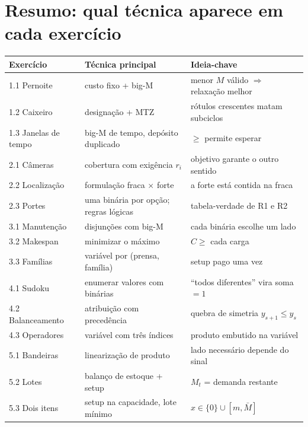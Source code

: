 \documentclass[11pt,a4paper]{article}
\begin{document}
\section*{Resumo: qual técnica aparece em cada exercício}
\begin{center}
\begin{tabular}{>{\raggedright}p{3.2cm}>{\raggedright}p{6.2cm}>{\raggedright\arraybackslash}p{4.8cm}}
\toprule
Exercício & Técnica principal & Ideia-chave\\
\midrule
1.1 Pernoite & custo fixo + big-M & menor $M$ válido $\Rightarrow$ relaxação melhor\\
1.2 Caixeiro & designação + MTZ & rótulos crescentes matam subciclos\\
1.3 Janelas de tempo & big-M de tempo, depósito duplicado & $\ge$ permite esperar\\
2.1 Câmeras & cobertura com exigência $r_i$ & objetivo garante o outro sentido\\
2.2 Localização & formulação fraca $\times$ forte & a forte está contida na fraca\\
2.3 Portes & uma binária por opção; regras lógicas & tabela-verdade de R1 e R2\\
3.1 Manutenção & disjunções com big-M & cada binária escolhe um lado\\
3.2 Makespan & minimizar o máximo & $C\ge$ cada carga\\
3.3 Famílias & variável por (prensa, família) & setup pago uma vez\\
4.1 Sudoku & enumerar valores com binárias & ``todos diferentes'' vira soma $=1$\\
4.2 Balanceamento & atribuição com precedência & quebra de simetria $y_{s+1}\le y_s$\\
4.3 Operadores & variável com três índices & produto embutido na variável\\
5.1 Bandeiras & linearização de produto & lado necessário depende do sinal\\
5.2 Lotes & balanço de estoque + setup & $M_t$ = demanda restante\\
5.3 Dois itens & setup na capacidade, lote mínimo & $x\in\{0\}\cup[m,\bar M]$\\
\bottomrule
\end{tabular}
\end{center}
\end{document}
